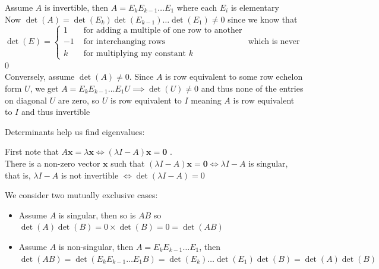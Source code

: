 \documentclass{report}
\begin{document}
\begin{myproof}
    Assume $A$ is invertible, then  $A = E_kE_{k-1}\ldots E_1$ where each $E_i$ is elementary \\ Now  $\det(A) = \det(E_k) \det (E_{k-1}) \ldots \det (E_1) \ne 0$ since we know that $\det (E) = \begin{cases}
        1 & \text{ for adding a multiple of one row to another} \\ -1 &  \text{ for interchanging rows} \\ k &  \text{ for multiplying my constant }k
    \end{cases}$ which is never $0$ \\ Conversely, assume  $\det (A) \ne 0.$ Since  $A$ is row equivalent to some row echelon form  $U$, we get  $A = E_k E_{k-1} \ldots E_1 U \implies \det (U) \ne 0$ and thus none of the entries on diagonal  $U$ are zero, so  $U$ is row equivalent to  $I$ meaning  $A$ is row equivalent to  $I$ and thus invertible
\end{myproof}


Determinants help us find eigenvalues:


\begin{myproof}
    First note that $A \mathbf{x} = \lambda \mathbf{x} \iff \left( \lambda I - A \right) \mathbf{x} = \mathbf{0}$ . \\ There is a non-zero vector $\mathbf{x}$ such that $\left( \lambda I - A \right) \mathbf{x} = \mathbf{0} \iff \lambda I - A$ is singular, that is, $ \lambda I - A$ is not invertible $ \iff \det ( \lambda I-A) = 0$
\end{myproof}

\begin{myproof}
    We consider two mutually exclusive cases:
    \begin{itemize}
        \item Assume $A$ is singular, then so is  $AB$ so  $\det (A) \det (B) = 0 \times \det(B) = 0 = \det (AB)$
        \item Assume $A$ is non-singular, then $A = E_k E_{k-1} \ldots E_1$, then $\det (AB) = \det \left( E_k E_{k-1}\ldots E_1 B \right)  = \det (E_k) \ldots \det(E_1) \det(B) = \det(A) \det(B)$
    \end{itemize}
\end{myproof}
\end{document}
